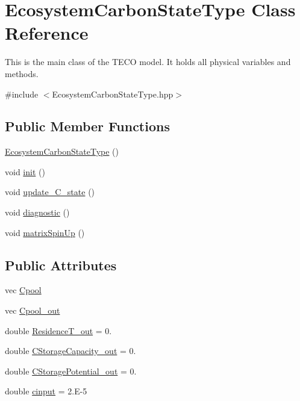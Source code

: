 \hypertarget{class_ecosystem_carbon_state_type}{}\section{Ecosystem\+Carbon\+State\+Type Class Reference}
\label{class_ecosystem_carbon_state_type}


This is the main class of the T\+E\+CO model. It holds all physical variables and methods.  




{\ttfamily \#include $<$Ecosystem\+Carbon\+State\+Type.\+hpp$>$}

\subsection*{Public Member Functions}
\begin{DoxyCompactItemize}
\item 
\mbox{\hyperlink{class_ecosystem_carbon_state_type_a88c8eda06ce5e4bd306220280718939a}{Ecosystem\+Carbon\+State\+Type}} ()
\item 
void \mbox{\hyperlink{class_ecosystem_carbon_state_type_af8446f966b95c51b061ac5199bd8bc26}{init}} ()
\item 
void \mbox{\hyperlink{class_ecosystem_carbon_state_type_a59643b09c425cf91f8c0098d1ab491d5}{update\+\_\+\+C\+\_\+state}} ()
\item 
void \mbox{\hyperlink{class_ecosystem_carbon_state_type_af3682294ea4888ea45404b675e184bd0}{diagnostic}} ()
\item 
void \mbox{\hyperlink{class_ecosystem_carbon_state_type_a9ea22da7d71c04e00dff17a4f225855a}{matrix\+Spin\+Up}} ()
\end{DoxyCompactItemize}
\subsection*{Public Attributes}
\begin{DoxyCompactItemize}
\item 
vec \mbox{\hyperlink{class_ecosystem_carbon_state_type_a4afa44d236701692fd58577a38e5fee0}{Cpool}}
\item 
vec \mbox{\hyperlink{class_ecosystem_carbon_state_type_a1638e17e4bfc9d670ac0bd6b17296978}{Cpool\+\_\+out}}
\item 
double \mbox{\hyperlink{class_ecosystem_carbon_state_type_aa98b5ed995c5f549c37d4131487d5707}{Residence\+T\+\_\+out}} = 0.
\item 
double \mbox{\hyperlink{class_ecosystem_carbon_state_type_a83eba36ac24e57454c571f632b25c22c}{C\+Storage\+Capacity\+\_\+out}} = 0.
\item 
double \mbox{\hyperlink{class_ecosystem_carbon_state_type_a124871db6c94642d98997a081d99370b}{C\+Storage\+Potential\+\_\+out}} = 0.
\item 
double \mbox{\hyperlink{class_ecosystem_carbon_state_type_ad0ba193f2679d48489a8199c555c7598}{cinput}} = 2.\+E-\/5
\end{DoxyCompactItemize}


